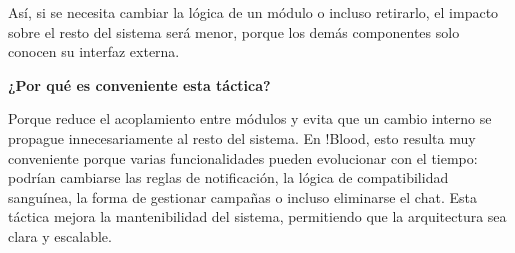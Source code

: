 Así, si se necesita cambiar la lógica de un módulo o incluso retirarlo, el impacto sobre el resto del sistema será menor, porque los demás componentes solo conocen su interfaz externa.

\medskip
\noindent\textbf{¿Por qué es conveniente esta táctica?}

Porque reduce el acoplamiento entre módulos y evita que un cambio interno se propague innecesariamente al resto del sistema. En !Blood, esto resulta muy conveniente porque varias funcionalidades pueden evolucionar con el tiempo: podrían cambiarse las reglas de notificación, la lógica de compatibilidad sanguínea, la forma de gestionar campañas o incluso eliminarse el chat. Esta táctica mejora la mantenibilidad del sistema, permitiendo que la arquitectura sea clara y escalable.
